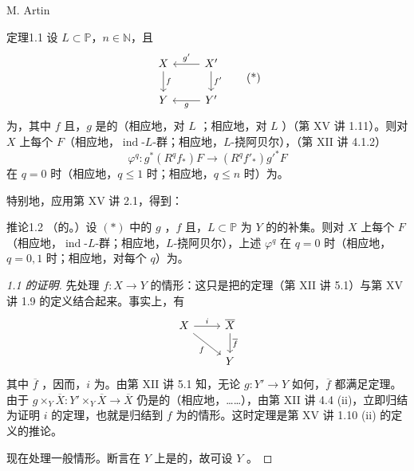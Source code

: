 \begin{center}M. Artin\end{center}
\begin{SGAresult}{定理}{1.1}
设 $L\subset\mathbb P$，$n\in\mathbb N$，且
\[
\begin{tikzcd}
X\arrow[d,"f" ]&X'\arrow[l,"g'"']\arrow[d,"f'"]\\
Y&Y'\arrow[l,"g"]
\end{tikzcd}\tag{*}
\]
为，其中 $f$ 且，$g$ 是的（相应地，对 $L$ ；相应地，对 $L$ ）（第 XV 讲 1.11）。则对 $X$ 上每个 $F$（相应地，$\operatorname{ind}$-$L$-群；相应地，$L$-挠阿贝尔），（第 XII 讲 4.1.2）
\[
\varphi^q:g^*(R^qf_*)F\longrightarrow(R^qf'_*)g'^*F
\]
在 $q=0$ 时（相应地，$q\leq1$ 时；相应地，$q\leq n$ 时）为。
\end{SGAresult}
特别地，应用第 XV 讲 2.1，得到：
\begin{SGAresult}{推论}{1.2}
（的。）设 $(*)$ 中的 $g$ ，$f$ 且，$L\subset\mathbb P$ 为 $Y$ 的的补集。则对 $X$ 上每个 $F$（相应地，$\operatorname{ind}$-$L$-群；相应地，$L$-挠阿贝尔），上述 $\varphi^q$ 在 $q=0$ 时（相应地，$q=0,1$ 时；相应地，对每个 $q$）为。
\end{SGAresult}
\begin{proof}[1.1 的证明]
先处理 $f:X\to Y$ 的情形：这只是把的定理（第 XII 讲 5.1）与第 XV 讲 1.9 的定义结合起来。事实上，有
\[
\begin{tikzcd}
X\arrow[r,"i"]\arrow[dr,"f"']&\overline X\arrow[d,"\overline f"]\\
&Y
\end{tikzcd}
\]
其中 $\overline f$ ，因而，$i$ 为。由第 XII 讲 5.1 知，无论 $g:Y'\to Y$ 如何，$\overline f$ 都满足定理。由于 $g\times_Y\overline X:Y'\times_Y\overline X\to\overline X$ 仍是的（相应地，……），由第 XII 讲 4.4 (ii)，立即归结为证明 $i$ 的定理，也就是归结到 $f$ 为的情形。这时定理是第 XV 讲 1.10 (ii) 的定义的推论。

现在处理一般情形。断言在 $Y$ 上是的，故可设 $Y$ 。
\end{proof}

